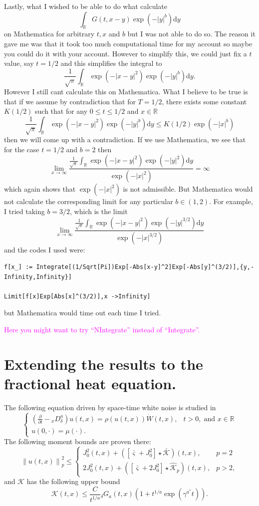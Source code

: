 \documentclass{article}
\numberwithin{equation}{section}
\newcommand{\R}{\mathbb{R}}
\newcommand{\Norm}[1]{\left\|  #1   \right\|}
\newcommand{\ud}{\ensuremath{\mathrm{d}}}
\begin{document}
Lastly, what I wished to be able to do what calculate
\[
\int_{\R} G(t,x-y)\exp(-|y|^b) \ud y
\]
on Mathematica for arbitrary $t,x$ and $b$ but I was not able to do so. The reason it gave me was that it took too much computational time for my account so maybe you could do it with your account. However to simplify this, we could just fix a $t$ value, say $t=1/2$ and this simplifies the integral to
\[
\frac{1}{\sqrt{\pi}} \int_{\R} \exp(-|x-y|^2)\exp(-|y|^b) \ud y.
\]
However I still cant calculate this on Mathematica. What I believe to be true is that if we assume by contradiction that for $T=1/2$, there exists some constant $K(1/2)$ such that for any $0 \le t \le 1/2$ and $x \in \R$
\[
\frac{1}{\sqrt{\pi}} \int_{\R} \exp(-|x-y|^2)\exp(-|y|^b) \ud y \le K(1/2)\exp(-|x|^b)
\]
then we will come up with a contradiction. If we use Mathematica, we see that for the case $t=1/2$ and $b=2$ then
\[
\lim_{x \to \infty}	\dfrac{	\frac{1}{\sqrt{\pi}} \int_{\R} \exp(-|x-y|^2)\exp(-|y|^2) \ud y}{\exp(-|x|^2)} = \infty
\]
which again shows that $\exp(-|x|^2)$ is not admissible. But Mathematica would not calculate the corresponding limit for any particular $b\in(1,2)$. For example, I tried taking $b=3/2$, which is the limit
\[
\lim_{x \to \infty}	\dfrac{	\frac{1}{\sqrt{\pi}} \int_{\R} \exp(-|x-y|^2)\exp(-|y|^{3/2}) \ud y}{\exp(-|x|^{3/2})}
\]
and the codes I used were:
\begin{verbatim}
f[x_] := Integrate[(1/Sqrt[Pi])Exp[-Abs[x-y]^2]Exp[-Abs[y]^(3/2)],{y,-Infinity,Infinity}]

Limit[f[x]Exp[Abs[x]^(3/2)],x ->Infinity]
\end{verbatim}
but Mathematica would time out each time I tried.

\bigskip
\textcolor{magenta}{Here you might want to try ``NIntegrate'' instead of ``Integrate''.}

\section{Extending the results to the fractional heat equation.}
The following equation driven by space-time white noise is studied in \cite{CDfracheat15}
	\[
	\begin{cases}
		\left( \frac{\partial}{\partial t} -{ _xD_\delta^a} \right)u(t,x) = \rho(u(t,x)) \dot{W}(t,x), & t>0, \; \text{and } x \in \R
		\\ u(0,\cdot) = \mu(\cdot).
	\end{cases}
	\]
The following moment bounds are proven there:
	\begin{equation}\label{E:fracheatspde} \Norm{u(t,x)}_p^2 \le
	\begin{cases}
	J_0^2(t,x) + ( [ \bar{\varsigma} + J_0^2] \star \bar{\mathcal{K}})(t,x), & p=2
	\\  	2J_0^2(t,x) + ( [ \bar{\varsigma} + 2J_0^2] \star \hat{\mathcal{K}}_p)(t,x), & p>2,
	\end{cases}
	\end{equation}
and $\mathcal{K}$ has the following upper bound
	\[
		\mathcal{K}(t,x) \le \frac{C}{t^{1/a}} {_\delta G_a}(t,x)\left(  1+ t^{1/a} \exp( \gamma^{a^*} t) \right).
	\]
\end{document}
